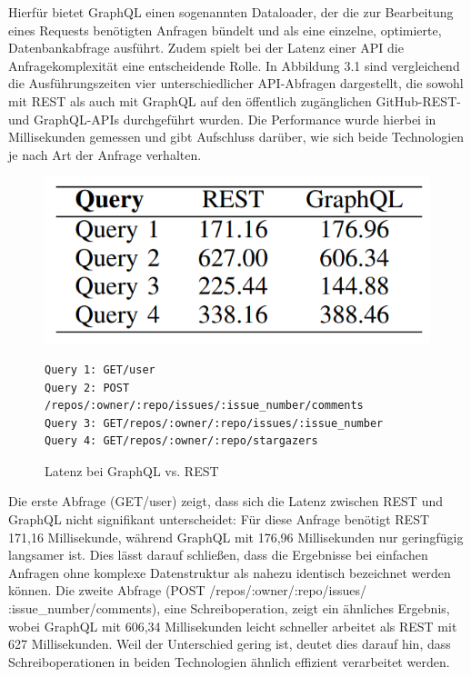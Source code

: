 \noindent
Hierfür bietet GraphQL einen sogenannten Dataloader, der die zur Bearbeitung eines Requests benötigten Anfragen bündelt und als eine einzelne, optimierte, Datenbankabfrage ausführt. \citep{nordstrom2022graphql}
\newpage
\noindent
Zudem spielt bei der Latenz einer API die Anfragekomplexität eine entscheidende Rolle. In Abbildung 3.1 sind vergleichend die Ausführungszeiten vier unterschiedlicher API-Abfragen dargestellt, die sowohl mit REST als auch mit GraphQL auf den öffentlich zugänglichen GitHub-REST- und GraphQL-APIs durchgeführt wurden. Die Performance wurde hierbei in Millisekunden gemessen und gibt Aufschluss darüber, wie sich beide Technologien je nach Art der Anfrage verhalten.
\begin{figure}[H]
	\centering
	\includegraphics[scale=.5]{Illustrations/cangraphqlreplacerest.png}
\begin{BVerbatim}
Query 1: GET/user
Query 2: POST /repos/:owner/:repo/issues/:issue_number/comments
Query 3: GET/repos/:owner/:repo/issues/:issue_number
Query 4: GET/repos/:owner/:repo/stargazers
\end{BVerbatim}
	\caption{Latenz bei GraphQL vs. REST \citep{graphqlreplacerest}}
\end{figure}
\noindent
Die erste Abfrage (GET/user) zeigt, dass sich die Latenz zwischen REST und GraphQL nicht signifikant unterscheidet: Für diese Anfrage benötigt REST 171,16 Millisekunde, während GraphQL mit 176,96 Millisekunden nur geringfügig langsamer ist. Dies lässt darauf schließen, dass die Ergebnisse bei einfachen Anfragen ohne komplexe Datenstruktur als nahezu identisch bezeichnet werden können. Die zweite Abfrage (POST /repos/:owner/:repo/issues/ :issue\_number/comments), eine Schreiboperation, zeigt ein ähnliches Ergebnis, wobei GraphQL mit 606,34 Millisekunden leicht schneller arbeitet als REST mit 627 Millisekunden. Weil der Unterschied gering ist, deutet dies darauf hin, dass Schreiboperationen in beiden Technologien ähnlich effizient verarbeitet werden. 
